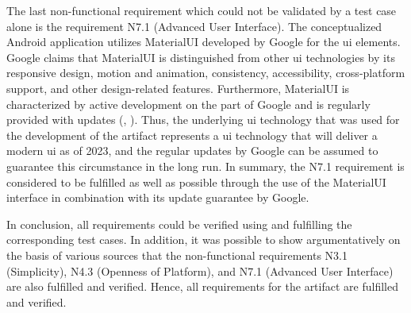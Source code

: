 The last non-functional requirement which could not be validated by a test case alone is the requirement N7.1 (Advanced User Interface). The conceptualized Android application utilizes MaterialUI developed by Google for the \ac{ui} elements. Google claims that MaterialUI is distinguished from other \ac{ui} technologies by its responsive design, motion and animation, consistency, accessibility, cross-platform support, and other design-related features. Furthermore, MaterialUI is characterized by active development on the part of Google and is regularly provided with updates (\cite{Google.2023c}, \cite{Google.2023}). Thus, the underlying \ac{ui} technology that was used for the development of the artifact represents a \ac{ui} technology that will deliver a modern \ac{ui} as of 2023, and the regular updates by Google can be assumed to guarantee this circumstance in the long run. In summary, the N7.1 requirement is considered to be fulfilled as well as possible through the use of the MaterialUI interface in combination with its update guarantee by Google. 

In conclusion, all requirements could be verified using and fulfilling the corresponding test cases. In addition, it was possible to show argumentatively on the basis of various sources that the non-functional requirements N3.1 (Simplicity), N4.3 (Openness of Platform), and N7.1 (Advanced User Interface) are also fulfilled and verified. Hence, all requirements for the artifact are fulfilled and verified.


